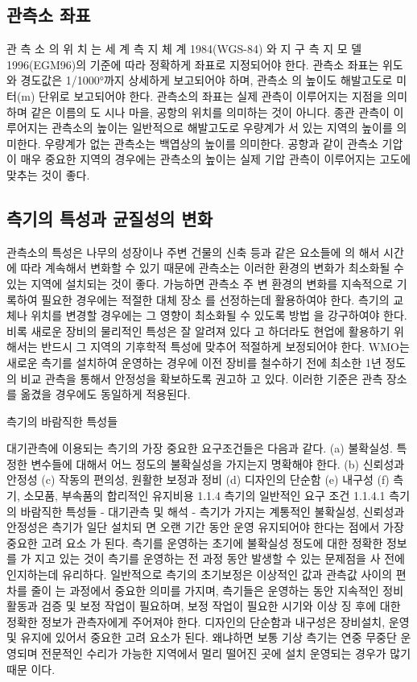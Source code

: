 \begin{itemize}
\subsection{관측소 좌표}
관 측 소 의 위 치 는 세 계 측 지 체 계 1984(WGS-84) 와 지 구 측 지 모 델
1996(EGM96)의 기준에 따라 정확하게 좌표로 지정되어야 한다. 관측소
좌표는 위도와 경도값은 1/1000°까지 상세하게 보고되어야 하며, 관측소
의 높이도 해발고도로 미터(m) 단위로 보고되어야 한다.
관측소의 좌표는 실제 관측이 이루어지는 지점을 의미하며 같은 이름의 도
시나 마을, 공항의 위치를 의미하는 것이 아니다. 종관 관측이 이루어지는
관측소의 높이는 일반적으로 해발고도로 우량계가 서 있는 지역의 높이를
의미한다. 우량계가 없는 관측소는 백엽상의 높이를 의미한다. 공항과 같이
관측소 기압이 매우 중요한 지역의 경우에는 관측소의 높이는 실제 기압
관측이 이루어지는 고도에 맞추는 것이 좋다.

\subsection{측기의 특성과 균질성의 변화}
관측소의 특성은 나무의 성장이나 주변 건물의 신축 등과 같은 요소들에 의
해서 시간에 따라 계속해서 변화할 수 있기 때문에 관측소는 이러한 환경의
변화가 최소화될 수 있는 지역에 설치되는 것이 좋다. 가능하면 관측소 주
변 환경의 변화를 지속적으로 기록하여 필요한 경우에는 적절한 대체 장소
를 선정하는데 활용하여야 한다.
측기의 교체나 위치를 변경할 경우에는 그 영향이 최소화될 수 있도록 방법
을 강구하여야 한다. 비록 새로운 장비의 물리적인 특성은 잘 알려져 있다
고 하더라도 현업에 활용하기 위해서는 반드시 그 지역의 기후학적 특성에
맞추어 적절하게 보정되어야 한다.
WMO는 새로운 측기를 설치하여 운영하는 경우에 이전 장비를 철수하기
전에 최소한 1년 정도의 비교 관측을 통해서 안정성을 확보하도록 권고하
고 있다. 이러한 기준은 관측 장소를 옮겼을 경우에도 동일하게 적용된다.

측기의 바람직한 특성들

대기관측에 이용되는 측기의 가장 중요한 요구조건들은 다음과 같다.
(a) 불확실성. 특정한 변수들에 대해서 어느 정도의 불확실성을 가지는지
명확해야 한다.
(b) 신뢰성과 안정성
(c) 작동의 편의성, 원활한 보정과 정비
(d) 디자인의 단순함
(e) 내구성
(f) 측기, 소모품, 부속품의 합리적인 유지비용
1.1.4 측기의 일반적인 요구 조건
1.1.4.1 측기의 바람직한 특성들
- 대기관측 및 해석
-
측기가 가지는 계통적인 불확실성, 신뢰성과 안정성은 측기가 일단 설치되
면 오랜 기간 동안 운영 유지되어야 한다는 점에서 가장 중요한 고려 요소
가 된다. 측기를 운영하는 초기에 불확실성 정도에 대한 정확한 정보를 가
지고 있는 것이 측기를 운영하는 전 과정 동안 발생할 수 있는 문제점을 사
전에 인지하는데 유리하다.
일반적으로 측기의 초기보정은 이상적인 값과 관측값 사이의 편차를 줄이
는 과정에서 중요한 의미를 가지며, 측기들은 운영하는 동안 지속적인 정비
활동과 검증 및 보정 작업이 필요하며, 보정 작업이 필요한 시기와 이상 징
후에 대한 정확한 정보가 관측자에게 주어져야 한다.
디자인의 단순함과 내구성은 장비설치, 운영 및 유지에 있어서 중요한 고려
요소가 된다. 왜냐하면 보통 기상 측기는 연중 무중단 운영되며 전문적인
수리가 가능한 지역에서 멀리 떨어진 곳에 설치 운영되는 경우가 많기 때문
이다.


\end{itemize}
